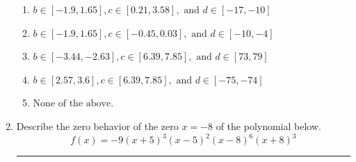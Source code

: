 \documentclass[14pt]{extbook}
\newcommand{\litem}[1]{\item#1\hspace*{-1cm}\rule{\textwidth}{0.4pt}}
\begin{document}
\begin{enumerate}
{\begin{enumerate}[label=\Alph*.]
\item \( b \in [-1.9, 1.65], c \in [0.21, 3.58], \text{ and } d \in [-17, -10] \)
\item \( b \in [-1.9, 1.65], c \in [-0.45, 0.03], \text{ and } d \in [-10, -4] \)
\item \( b \in [-3.44, -2.63], c \in [6.39, 7.85], \text{ and } d \in [73, 79] \)
\item \( b \in [2.57, 3.6], c \in [6.39, 7.85], \text{ and } d \in [-75, -74] \)
\item \( \text{None of the above.} \)

\end{enumerate} }
\litem{
Describe the zero behavior of the zero $x = -8$ of the polynomial below.\[ f(x) = -9(x + 5)^{3}(x - 5)^{2}(x - 8)^{6}(x + 8)^{3} \]\begin{enumerate}[label=\Alph*.]

\end{enumerate}}
\end{enumerate}
\end{document}

